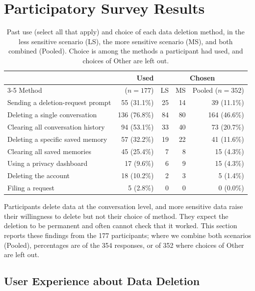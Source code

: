 \section{Participatory Survey Results}
\label{sec:qual_results}

\begin{table}[!t]
\centering
\caption{Past use (select all that apply) and choice of each data deletion method, in the less sensitive scenario (LS), the more sensitive scenario (MS), and both combined (Pooled). Choice is among the methods a participant had used, and choices of Other are left out.}
\label{tab:method-use}
\small
\begin{tabular}{@{}lrrrr@{}}
\toprule
 & Used & \multicolumn{3}{c}{Chosen} \\
\cmidrule(lr){3-5}
Method & ($n=177$) & LS & MS & Pooled ($n=352$) \\
\midrule
Sending a deletion-request prompt & 55 (31.1\%) & 25 & 14 & 39 (11.1\%) \\
Deleting a single conversation & 136 (76.8\%) & 84 & 80 & 164 (46.6\%) \\
Clearing all conversation history & 94 (53.1\%) & 33 & 40 & 73 (20.7\%) \\
Deleting a specific saved memory & 57 (32.2\%) & 19 & 22 & 41 (11.6\%) \\
Clearing all saved memories & 45 (25.4\%) & 7 & 8 & 15 (4.3\%) \\
Using a privacy dashboard & 17 (9.6\%) & 6 & 9 & 15 (4.3\%) \\
Deleting the account & 18 (10.2\%) & 2 & 3 & 5 (1.4\%) \\
Filing a request & 5 (2.8\%) & 0 & 0 & 0 (0.0\%) \\
\bottomrule
\end{tabular}
\end{table}

Participants delete data at the conversation level, and more sensitive data raise their willingness to delete but not their choice of method. They expect the deletion to be permanent and often cannot check that it worked. This section reports these findings from the 177 participants; where we combine both scenarios (Pooled), percentages are of the 354 responses, or of 352 where choices of Other are left out.

\subsection{User Experience about Data Deletion}


